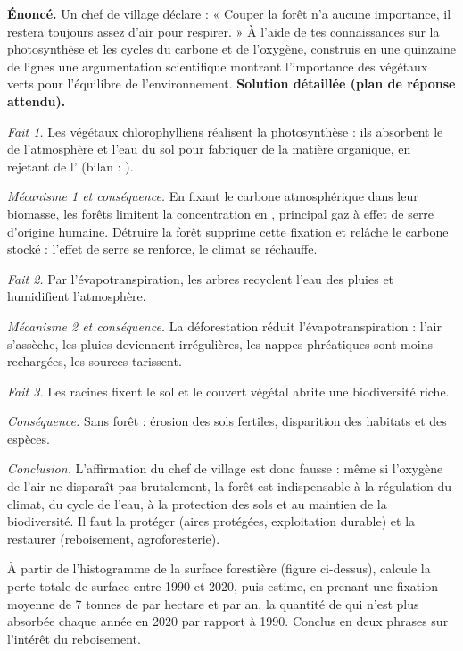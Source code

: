 \documentclass[11pt]{article}
\begin{document}
\begin{exoresolu}
\textbf{Énoncé.} Un chef de village déclare : « Couper la forêt n'a aucune importance, il restera toujours assez d'air pour respirer. » À l'aide de tes connaissances sur la photosynthèse et les cycles du carbone et de l'oxygène, construis en une quinzaine de lignes une argumentation scientifique montrant l'importance des végétaux verts pour l'équilibre de l'environnement.
\tcblower
\textbf{Solution détaillée (plan de réponse attendu).}

\emph{Fait 1.} Les végétaux chlorophylliens réalisent la photosynthèse : ils absorbent le  de l'atmosphère et l'eau du sol pour fabriquer de la matière organique, en rejetant de l' (bilan : ).

\emph{Mécanisme 1 et conséquence.} En fixant le carbone atmosphérique dans leur biomasse, les forêts limitent la concentration en , principal gaz à effet de serre d'origine humaine. Détruire la forêt supprime cette fixation et relâche le carbone stocké : l'effet de serre se renforce, le climat se réchauffe.

\emph{Fait 2.} Par l'évapotranspiration, les arbres recyclent l'eau des pluies et humidifient l'atmosphère.

\emph{Mécanisme 2 et conséquence.} La déforestation réduit l'évapotranspiration : l'air s'assèche, les pluies deviennent irrégulières, les nappes phréatiques sont moins rechargées, les sources tarissent.

\emph{Fait 3.} Les racines fixent le sol et le couvert végétal abrite une biodiversité riche.

\emph{Conséquence.} Sans forêt : érosion des sols fertiles, disparition des habitats et des espèces.

\emph{Conclusion.} L'affirmation du chef de village est donc fausse : même si l'oxygène de l'air ne disparaît pas brutalement, la forêt est indispensable à la régulation du climat, du cycle de l'eau, à la protection des sols et au maintien de la biodiversité. Il faut la protéger (aires protégées, exploitation durable) et la restaurer (reboisement, agroforesterie).
\end{exoresolu}

\begin{exercice}
À partir de l'histogramme de la surface forestière (figure ci-dessus), calcule la perte totale de surface entre 1990 et 2020, puis estime, en prenant une fixation moyenne de 7 tonnes de  par hectare et par an, la quantité de  qui n'est plus absorbée chaque année en 2020 par rapport à 1990. Conclus en deux phrases sur l'intérêt du reboisement.
\end{exercice}
\end{document}
